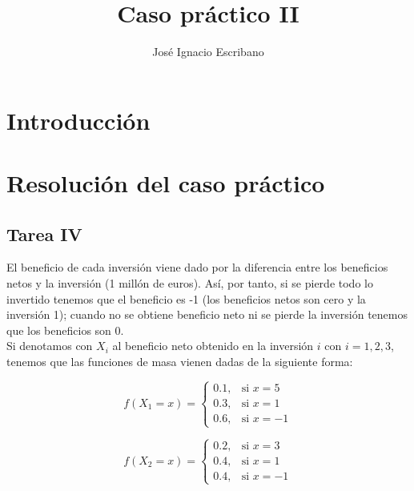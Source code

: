 \documentclass[12pt,a4paper,twoside,openright,titlepage,final]{article}
\author{José Ignacio Escribano}
\title{Caso práctico II}
\begin{document}
\setcounter{page}{1}


\listoffigures
\thispagestyle{empty}
\newpage

\tableofcontents
\thispagestyle{empty}
\newpage


\setcounter{page}{1}

\section{Introducción}


\section{Resolución del caso práctico}



\subsection{Tarea IV}

El beneficio de cada inversión viene dado por la diferencia entre los beneficios netos y la inversión (1 millón de euros). Así, por tanto, si se pierde todo lo invertido tenemos que el beneficio es -1 (los beneficios netos son cero y la inversión 1); cuando no se obtiene beneficio neto ni se pierde la inversión tenemos que los beneficios son 0.\\

Si denotamos con $X_i$ al beneficio neto obtenido en la inversión $i$ con $i = 1,2,3$, tenemos que las funciones de masa vienen dadas de la siguiente forma:

\begin{equation*}
f(X_1 = x) = \begin{cases}
0.1, & \text{si } x = 5 \\
0.3, & \text{si } x = 1 \\
0.6, & \text{si } x = -1
\end{cases}
\end{equation*}

\begin{equation*}
f(X_2 = x) = \begin{cases}
0.2, & \text{si } x = 3 \\
0.4, & \text{si } x = 1 \\
0.4, & \text{si } x = -1
\end{cases}
\end{equation*}
\end{document}
